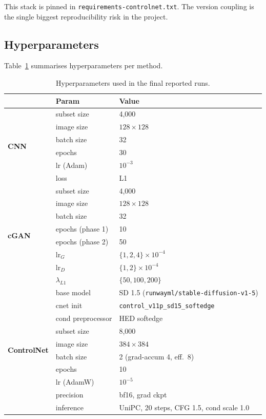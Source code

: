\documentclass[conference]{IEEEtran}
\begin{document}
This stack is pinned in \texttt{requirements-controlnet.txt}. The
version coupling is the single biggest reproducibility risk in the
project.

\subsection{Hyperparameters}
Table~\ref{tab:hparams} summarises hyperparameters per method.

\begin{table}[!t]
\centering
\caption{Hyperparameters used in the final reported runs.}
\label{tab:hparams}
\begin{tabular}{lll}
\toprule
& \textbf{Param} & \textbf{Value} \\
\midrule
\multirow{6}{*}{\textbf{CNN}}
  & subset size      & 4{,}000      \\
  & image size       & $128\times128$ \\
  & batch size       & 32           \\
  & epochs           & 30           \\
  & lr (Adam)        & $10^{-3}$    \\
  & loss             & L1           \\
\midrule
\multirow{8}{*}{\textbf{cGAN}}
  & subset size      & 4{,}000      \\
  & image size       & $128\times128$ \\
  & batch size       & 32           \\
  & epochs (phase 1) & 10           \\
  & epochs (phase 2) & 50           \\
  & lr$_G$           & $\{1,2,4\}\!\times\!10^{-4}$ \\
  & lr$_D$           & $\{1,2\}\!\times\!10^{-4}$   \\
  & $\lambda_{L1}$   & $\{50,100,200\}$            \\
\midrule
\multirow{10}{*}{\textbf{ControlNet}}
  & base model       & SD 1.5 (\texttt{runwayml/stable-diffusion-v1-5}) \\
  & cnet init        & \texttt{control\_v11p\_sd15\_softedge} \\
  & cond preprocessor& HED softedge  \\
  & subset size      & 8{,}000      \\
  & image size       & $384\times384$ \\
  & batch size       & 2 (grad-accum 4, eff.\ 8) \\
  & epochs           & 10            \\
  & lr (AdamW)       & $10^{-5}$    \\
  & precision        & bf16, grad ckpt \\
  & inference        & UniPC, 20 steps, CFG 1.5, cond scale 1.0 \\
\bottomrule
\end{tabular}
\end{table}
\end{document}

